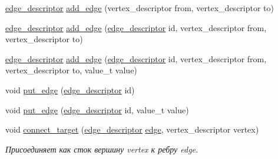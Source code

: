 \begin{DoxyCompactItemize}
\item 
\hyperlink{class_s_p_u___g_r_a_p_h_1_1_spu_ultra_graph_a5f3776e003ef0a1648f1d9f84289810b}{edge\+\_\+descriptor} \hyperlink{class_s_p_u___g_r_a_p_h_1_1_spu_ultra_graph_acf32b6a942095ea0c61b52b6596c8ecb}{add\+\_\+edge} (vertex\+\_\+descriptor from, vertex\+\_\+descriptor to)
\item 
\hyperlink{class_s_p_u___g_r_a_p_h_1_1_spu_ultra_graph_a5f3776e003ef0a1648f1d9f84289810b}{edge\+\_\+descriptor} \hyperlink{class_s_p_u___g_r_a_p_h_1_1_spu_ultra_graph_a498c64e2dafbb4b294367ec325536b4f}{add\+\_\+edge} (\hyperlink{class_s_p_u___g_r_a_p_h_1_1_spu_ultra_graph_a5f3776e003ef0a1648f1d9f84289810b}{edge\+\_\+descriptor} id, vertex\+\_\+descriptor from, vertex\+\_\+descriptor to)
\item 
\hyperlink{class_s_p_u___g_r_a_p_h_1_1_spu_ultra_graph_a5f3776e003ef0a1648f1d9f84289810b}{edge\+\_\+descriptor} \hyperlink{class_s_p_u___g_r_a_p_h_1_1_spu_ultra_graph_ab5389e1991a4c62b9da22b9dfd9e21f6}{add\+\_\+edge} (\hyperlink{class_s_p_u___g_r_a_p_h_1_1_spu_ultra_graph_a5f3776e003ef0a1648f1d9f84289810b}{edge\+\_\+descriptor} id, vertex\+\_\+descriptor from, vertex\+\_\+descriptor to, value\+\_\+t value)
\item 
void \hyperlink{class_s_p_u___g_r_a_p_h_1_1_spu_ultra_graph_a2039e0d5257d32c98a3207fdadb9f0b1}{put\+\_\+edge} (\hyperlink{class_s_p_u___g_r_a_p_h_1_1_spu_ultra_graph_a5f3776e003ef0a1648f1d9f84289810b}{edge\+\_\+descriptor} id)
\item 
void \hyperlink{class_s_p_u___g_r_a_p_h_1_1_spu_ultra_graph_a0688a06a76998bb616c6e8e97e86572c}{put\+\_\+edge} (\hyperlink{class_s_p_u___g_r_a_p_h_1_1_spu_ultra_graph_a5f3776e003ef0a1648f1d9f84289810b}{edge\+\_\+descriptor} id, value\+\_\+t value)
\item 
\mbox{\label{class_s_p_u___g_r_a_p_h_1_1_spu_ultra_graph_a6ba487d6ba373e72d6be01190606dbeb}} 
void \hyperlink{class_s_p_u___g_r_a_p_h_1_1_spu_ultra_graph_a6ba487d6ba373e72d6be01190606dbeb}{connect\+\_\+target} (\hyperlink{class_s_p_u___g_r_a_p_h_1_1_spu_ultra_graph_a5f3776e003ef0a1648f1d9f84289810b}{edge\+\_\+descriptor} \hyperlink{class_s_p_u___g_r_a_p_h_1_1_spu_ultra_graph_a51468aa2278d3abb0c338ffbeac7747a}{edge}, vertex\+\_\+descriptor vertex)
\begin{DoxyCompactList}\small\item\em Присоединяет как сток вершину vertex к ребру edge. \end{DoxyCompactList}\item 

\end{DoxyCompactItemize}

